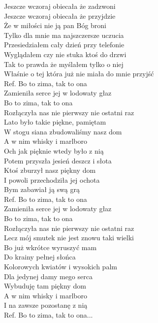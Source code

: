 
\begin{flushleft}
Jeszcze wczoraj obiecała że zadzwoni \\
Jeszcze wczoraj obiecała że przyjdzie  \\
Że w miłości nie ją pan Bóg broni  \\
Tylko dla mnie ma najszczersze uczucia  \\
Przesiedziałem cały dzień przy telefonie  \\
Wyglądałem czy nie stuka ktoś do drzwi  \\
Tak to prawda że myślałem tylko o niej  \\
Właśnie o tej która już nie miała do mnie przyjść  \\
\vskip 3mm
Ref. Bo to zima, tak to ona\\
\hspace{0.9cm}Zamieniła serce jej w lodowaty głaz \\
\hspace{0.9cm}Bo to zima, tak to ona \\
\hspace{0.9cm}Rozłączyła nas nie pierwszy nie ostatni raz  \\
\vskip 3mm
Lato było takie piękne, pamiętam  \\
W stogu siana zbudowaliśmy nasz dom  \\
A w nim whisky i marlboro \\
Och jak pięknie wtedy było z nią  \\
Potem przyszła jesień deszcz i słota  \\
Ktoś zburzył nasz piękny dom  \\
I powoli przechodziła jej ochota  \\
Bym zabawiał ją swą grą  \\
\vskip 3mm
Ref. Bo to zima, tak to ona\\
\hspace{0.9cm}Zamieniła serce jej w lodowaty głaz \\
\hspace{0.9cm}Bo to zima, tak to ona \\
\hspace{0.9cm}Rozłączyła nas nie pierwszy nie ostatni raz  \\
\vskip 3mm
Lecz mój smutek nie jest znowu taki wielki  \\
Bo już wkrótce wyruszyć mam  \\
Do krainy pełnej słońca  \\
Kolorowych kwiatów i wysokich palm  \\
Dla jedynej damy mego serca  \\
Wybuduję tam piękny dom  \\
A w nim whisky i marlboro  \\
I na zawsze pozostanę z nią  \\
\vskip 3mm
Ref. Bo to zima, tak to ona...\\
\end{flushleft}
\clearpage
